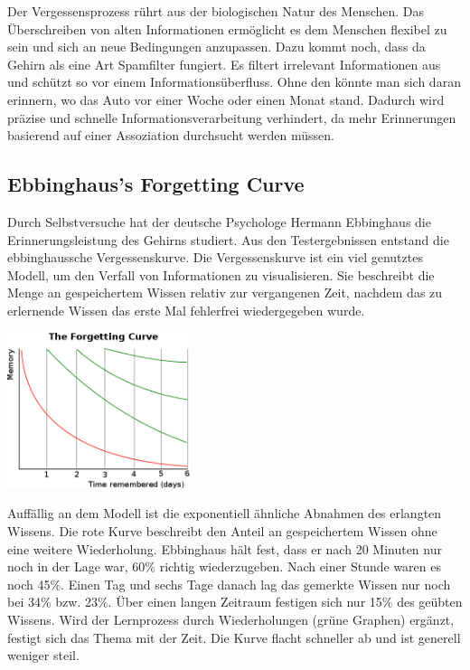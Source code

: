 Der Vergessensprozess rührt aus der biologischen Natur des Menschen. Das Überschreiben von alten Informationen ermöglicht es dem Menschen flexibel zu sein und sich an neue Bedingungen anzupassen. Dazu kommt noch, dass da Gehirn als eine Art Spamfilter fungiert. Es filtert irrelevant Informationen aus und schützt so vor einem Informationsüberfluss. Ohne den könnte man sich daran erinnern, wo das Auto vor einer Woche oder einen Monat stand. Dadurch wird präzise und schnelle Informationsverarbeitung verhindert, da mehr Erinnerungen basierend auf einer Assoziation durchsucht werden müssen.\cite{SDW:Vergessen}

\subsection{Ebbinghaus's Forgetting Curve}
Durch Selbstversuche hat der deutsche Psychologe Hermann Ebbinghaus die Erinnerungsleistung des Gehirns studiert. Aus den Testergebnissen entstand die ebbinghaussche Vergessenskurve. Die Vergessenskurve ist ein viel genutztes Modell, um den Verfall von Informationen zu visualisieren. Sie beschreibt die Menge an gespeichertem Wissen relativ zur vergangenen Zeit, nachdem das zu erlernende Wissen das erste Mal fehlerfrei wiedergegeben wurde.\cite{Wiki:Vergessenskurve}

\begin{center}
\includegraphics[width=0.4\textwidth]{images/vergessenskurve.png}
\end{center}

Auffällig an dem Modell ist die exponentiell ähnliche Abnahmen des erlangten Wissens. Die rote Kurve beschreibt den Anteil an gespeichertem Wissen ohne eine weitere Wiederholung. Ebbinghaus hält fest, dass er nach 20 Minuten nur noch in der Lage war, 60\% richtig wiederzugeben. Nach einer Stunde waren es noch 45\%. Einen Tag und sechs Tage danach lag das gemerkte Wissen nur noch bei 34\% bzw. 23\%. Über einen langen Zeitraum festigen sich nur 15\% des geübten Wissens. Wird der Lernprozess durch Wiederholungen (grüne Graphen) ergänzt, festigt sich das Thema mit der Zeit. Die Kurve flacht schneller ab und ist generell weniger steil.\cite{Wiki:Vergessenskurve}

